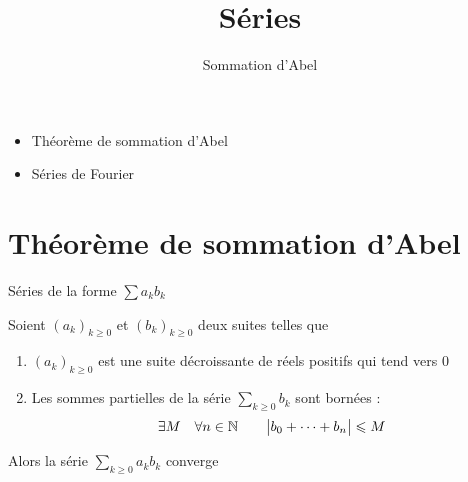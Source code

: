 


\usepackage{mathtools}
   





\title{{\bf Séries}}
\subtitle{Sommation d'Abel}

\begin{frame}
  
  \debutmontitre

  \pause

{\footnotesize
\hfill
{}
\begin{minipage}{0.6\textwidth}
  \begin{itemize}
    \item<3-> Théorème de sommation d'Abel
    \item<4-> Séries de Fourier
  \end{itemize}
\end{minipage}
}

\end{frame}

\setcounter{framenumber}{0}





\section{Théorème de sommation d'Abel}

\begin{frame}
Séries de la forme $\sum a_kb_k$

\pause
\begin{theoreme}
Soient $(a_k)_{k\ge0}$ et $(b_k)_{k\ge0}$ deux suites telles que 
\begin{enumerate}
\item\pause $(a_k)_{k\ge0}$ est une suite décroissante de réels positifs qui tend vers $0$
\item\pause Les sommes partielles de la série $\displaystyle\sum_{k\ge0} b_k$ sont bornées :
$$\exists M\quad\forall n\in \mathbb{N}\qquad
\big|b_0+\cdots+b_n\big|\leqslant M$$
\end{enumerate}
\pause
Alors la série $\displaystyle\sum_{k\ge0} a_kb_k$ converge
\end{theoreme}
\end{frame}



